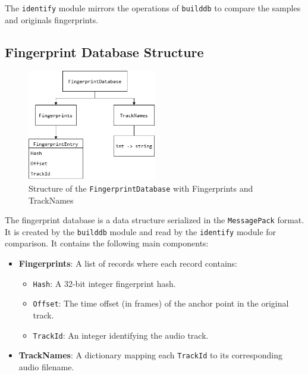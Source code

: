 \documentclass[11pt, a4paper]{article}
\begin{document}
    The \texttt{identify} module mirrors the operations of \texttt{builddb} to compare the samples and originals fingerprints. 
    
    \subsection{Fingerprint Database Structure}

    \begin{figure}[H]
        \centering
        \includegraphics[width=0.5\textwidth]{media/database_structure.png}
        \caption{Structure of the \texttt{FingerprintDatabase} with Fingerprints and TrackNames}
        \label{fig:database_structure}
    \end{figure}

    The fingerprint database is a data structure serialized in the \texttt{MessagePack} format. It is created by the \texttt{builddb} module and read by the \texttt{identify} module for comparison.
    It contains the following main components:

    \begin{itemize}
        \item \textbf{Fingerprints}: A list of records where each record contains:
        \begin{itemize}
            \item \texttt{Hash}: A 32-bit integer fingerprint hash.
            \item \texttt{Offset}: The time offset (in frames) of the anchor point in the original track.
            \item \texttt{TrackId}: An integer identifying the audio track.
        \end{itemize}
        \item \textbf{TrackNames}: A dictionary mapping each \texttt{TrackId} to its corresponding audio filename.
    \end{itemize}
\end{document}
